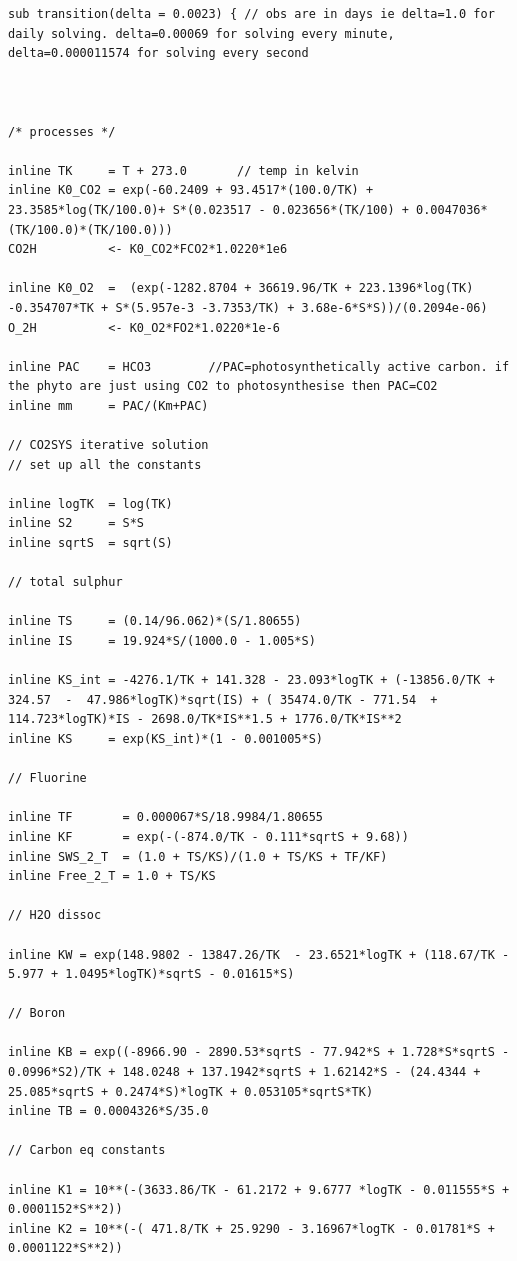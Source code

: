 \documentclass{ruthesis}
\begin{document}
\begin{verbatim}
sub transition(delta = 0.0023) { // obs are in days ie delta=1.0 for daily solving. delta=0.00069 for solving every minute, delta=0.000011574 for solving every second



/* processes */

inline TK     = T + 273.0		// temp in kelvin
inline K0_CO2 = exp(-60.2409 + 93.4517*(100.0/TK) + 23.3585*log(TK/100.0)+ S*(0.023517 - 0.023656*(TK/100) + 0.0047036*(TK/100.0)*(TK/100.0)))
CO2H          <- K0_CO2*FCO2*1.0220*1e6

inline K0_O2  =  (exp(-1282.8704 + 36619.96/TK + 223.1396*log(TK) -0.354707*TK + S*(5.957e-3 -3.7353/TK) + 3.68e-6*S*S))/(0.2094e-06)
O_2H 	      <- K0_O2*FO2*1.0220*1e-6

inline PAC    = HCO3  		//PAC=photosynthetically active carbon. if the phyto are just using CO2 to photosynthesise then PAC=CO2
inline mm     = PAC/(Km+PAC)

// CO2SYS iterative solution
// set up all the constants

inline logTK  = log(TK)
inline S2     = S*S
inline sqrtS  = sqrt(S)

// total sulphur

inline TS     = (0.14/96.062)*(S/1.80655)
inline IS     = 19.924*S/(1000.0 - 1.005*S)

inline KS_int = -4276.1/TK + 141.328 - 23.093*logTK + (-13856.0/TK + 324.57  -  47.986*logTK)*sqrt(IS) + ( 35474.0/TK - 771.54  + 114.723*logTK)*IS - 2698.0/TK*IS**1.5 + 1776.0/TK*IS**2
inline KS     = exp(KS_int)*(1 - 0.001005*S)

// Fluorine

inline TF       = 0.000067*S/18.9984/1.80655
inline KF       = exp(-(-874.0/TK - 0.111*sqrtS + 9.68))
inline SWS_2_T  = (1.0 + TS/KS)/(1.0 + TS/KS + TF/KF)
inline Free_2_T = 1.0 + TS/KS

// H2O dissoc

inline KW = exp(148.9802 - 13847.26/TK  - 23.6521*logTK + (118.67/TK - 5.977 + 1.0495*logTK)*sqrtS - 0.01615*S)

// Boron

inline KB = exp((-8966.90 - 2890.53*sqrtS - 77.942*S + 1.728*S*sqrtS - 0.0996*S2)/TK + 148.0248 + 137.1942*sqrtS + 1.62142*S - (24.4344 + 25.085*sqrtS + 0.2474*S)*logTK + 0.053105*sqrtS*TK)
inline TB = 0.0004326*S/35.0

// Carbon eq constants

inline K1 = 10**(-(3633.86/TK - 61.2172 + 9.6777 *logTK - 0.011555*S + 0.0001152*S**2))
inline K2 = 10**(-( 471.8/TK + 25.9290 - 3.16967*logTK - 0.01781*S + 0.0001122*S**2))


\end{verbatim}
\end{document}
